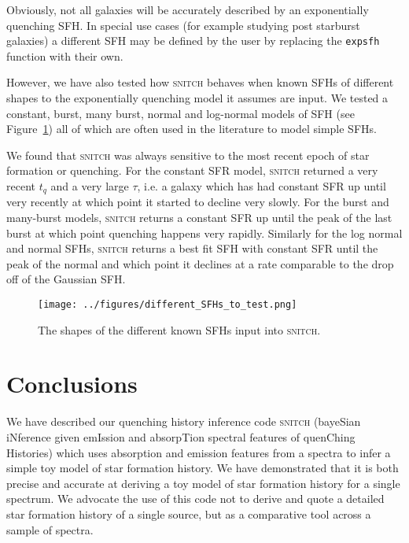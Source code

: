 \documentclass[useAMS,usenatbib]{mn2e}
\begin{document}
Obviously, not all galaxies will be accurately described by an exponentially quenching SFH. In special use cases (for example studying post starburst galaxies) a different SFH may be defined by the user by replacing the \texttt{expsfh} function with their own. 

However, we have also tested how \textsc{snitch} behaves when known SFHs of different shapes to the exponentially quenching model it assumes are input. We tested a constant, burst, many burst, normal and log-normal models of SFH (see Figure~\ref{fig:differentSFHs}) all of which are often used in the literature to model simple SFHs. 

We found that \textsc{snitch} was always sensitive to the most recent epoch of star formation or quenching. For the constant SFR model, \textsc{snitch} returned a very recent $t_q$ and a very large $\tau$, i.e. a galaxy which has had constant SFR up until very recently at which point it started to decline very slowly. For the burst and many-burst models, \textsc{snitch} returns a constant SFR up until the peak of the last burst at which point quenching happens very rapidly. Similarly for the log normal and normal SFHs, \textsc{snitch} returns a best fit SFH with constant SFR until the peak of the normal and which point it declines at a rate comparable to the drop off of the Gaussian SFH. 

\begin{figure}
\centering
\texttt{[image: ../figures/different\_SFHs\_to\_test.png]}
\caption{The shapes of the different known SFHs input into \textsc{snitch}.}
\label{fig:differentSFHs}
\end{figure}


\section{Conclusions}

We have described our quenching history inference code \textsc{snitch} (bayeSian iNference given emIssion and absorpTion spectral features of quenChing Histories) which uses absorption and emission features from a spectra to infer a simple toy model of star formation history. We have demonstrated that it is both precise and accurate at deriving a toy model of star formation history for a single spectrum. We advocate the use of this code not to derive and quote a detailed star formation history of a single source, but as a comparative tool across a sample of spectra. 


  
\end{document}

